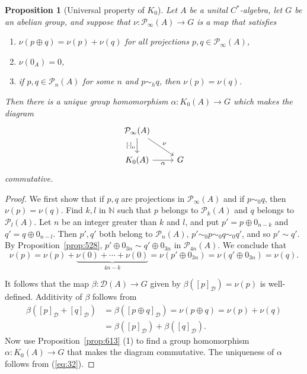 \documentclass{book}
\newtheorem{proposition}[definition]{Proposition}
\def\cstar{\(C^*\)-algebra}
\begin{document}
\begin{proposition}[Universal property of \(K_0\)]\label{prop:618}
  Let \(A\) be a unital \cstar, let \(G\) be an abelian group, and suppose that \(\nu:\mathcal{P}_\infty(A)\rightarrow G\) is a map that satisfies
  \begin{enumerate}
    \item \(\nu(p\oplus q)=\nu(p)+\nu(q)\) for all projections \(p,q\in\mathcal{P}_\infty(A)\),
    \item \(\nu(0_A)=0\),
    \item if \(p,q\in\mathcal{P}_n(A)\) for some \(n\) and \(p\sim_h q\), then \(\nu(p)=\nu(q)\).
  \end{enumerate}
  Then there is a unique group homomorphism \(\alpha:K_0(A)\rightarrow G\) which makes the diagram
  \begin{equation}\label{diag:33}
  \begin{tikzcd}
  \mathcal{P}_\infty(A) \arrow[rd, "\nu"] \arrow[d, swap, "{{[\cdot]}_0}"]&\\
  K_0(A) \arrow[r, swap, "\alpha"]
  & G
  \end{tikzcd}
\end{equation}
commutative.
\end{proposition}
\begin{proof}
  We first show that if \(p, q\) are projections in \(\mathcal{P}_\infty(A)\)
  and if \(p\sim_0 q\), then \(\nu(p)=\nu(q)\). Find \(k, l\) in \(\mathbb{N}\) such that \(p\) belongs to \(\mathcal{P}_k(A)\)
  and \(q\) belongs to \(\mathcal{P}_l(A)\). Let \(n\) be an integer greater than \(k\) and \(l\), and put \(p'=p\oplus 0_{n-k}\)
  and \(q'=q\oplus 0_{n-l}\). Then \(p',q'\) both belong to \(\mathcal{P}_n(A)\),
  \(p'\sim_0 p\sim_0 q\sim_0 q'\), and so \(p'\sim q'\). By Proposition~\ref{prop:528}, \(p'\oplus 0_{3n}\sim q'\oplus 0_{3n}\) in \(\mathcal{P}_{4n}(A)\).
  We conclude that
  \[
    \nu(p)=\nu(p)+\underbrace{\nu(0)+\cdots+\nu(0)}_{4n-k}=\nu(p'\oplus 0_{3n})=\nu(q'\oplus 0_{3n})=\nu(q).
  \]\par
  It follows that the map \(\beta:\mathcal{D}(A)\rightarrow G\) given by \(\beta({[p]}_\mathcal{D})=\nu(p)\) is well-defined.
  Additivity of \(\beta\) follows from
  \begin{align*}
    \beta({[p]}_\mathcal{D}+{[q]}_\mathcal{D})&=\beta({[p\oplus q]}_\mathcal{D})=\nu(p\oplus q)=\nu(p)+\nu(q)\\
    &=\beta({[p]}_\mathcal{D})+\beta({[q]}_\mathcal{D}).
  \end{align*}
  Now use Proposition~\ref{prop:613} (1) to find a group homomorphism \(\alpha:K_0(A)\rightarrow G\) that makes the diagram commutative.
  The uniqueness of \(\alpha\) follows from (\ref{eq:32}).
\end{proof}
\end{document}
